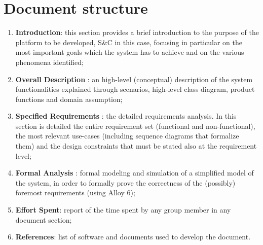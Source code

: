 	\section{Document structure}
		\begin{enumerate}
			\item \textbf{Introduction}: this section provides a brief introduction to the purpose of the platform to be developed, S\&C in this case, focusing in particular on the most important goals which the system has to achieve and on the various phenomena identified;
			\item \textbf{Overall Description} : an high-level (conceptual) description of the system functionalities explained through scenarios, high-level class diagram, product functions and domain assumption;
			\item \textbf{Specified Requirements} : the detailed requirements analysis. In this section is detailed the entire requirement set (functional and non-functional), the most relevant use-cases (including sequence diagrams that formalize them) and the design constraints that must be stated also at the requirement level;
			\item \textbf{Formal Analysis} : formal modeling and simulation of a simplified model of the system, in order to formally prove the correctness of the (possibly) foremost requirements (using Alloy 6);
			\item \textbf{Effort Spent}: report of the time spent by any group member in any document section;
			\item \textbf{References}: list of software and documents used to develop the document.
		\end{enumerate}